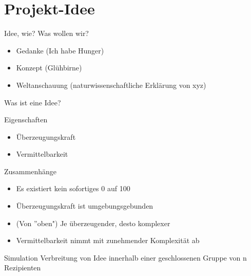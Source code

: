 \section{Projekt-Idee}
\begin{frame}{Idee, wie? Was wollen wir?}
	\begin{itemize}
		\item<1> Gedanke (Ich habe Hunger)
		\item<2> Konzept (Glühbirne)
		\item<3> Weltanschauung (naturwissenschaftliche Erklärung von xyz)
	\end{itemize}
\end{frame}

\begin{frame}{Was ist eine Idee?}
	\begin{block}{Eigenschaften}
		\begin{itemize}[<+->]
			\item Überzeugungskraft
			\item Vermittelbarkeit
		\end{itemize}
	\end{block}	
\end{frame}

\begin{frame}{Zusammenhänge}
	\begin{itemize}[<+->]
		\item Es existiert kein sofortiges 0 auf 100
		\item Überzeugungskraft ist umgebungsgebunden
		\item (Von ''oben") Je überzeugender, desto komplexer
		\item Vermittelbarkeit nimmt mit zunehmender Komplexität ab
	\end{itemize}
\end{frame}

\begin{frame}{Simulation}
	Verbreitung von Idee innerhalb einer geschlossenen Gruppe von n Rezipienten %
\end{frame}